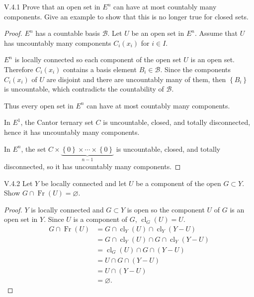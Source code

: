 \begin{problem}{V.4.1}
Prove that an open set in \( E^{n} \) can have at most countably many components. Give an example to show that this is no longer true for closed sets.
\end{problem}

\begin{proof}
	\( E^{n} \) has a countable basis \( \mathscr{B} \). Let \( U \) be an open set in \( E^{n} \). Assume that \( U \) has uncountably many components \( C_{i}(x_{i}) \) for \( i \in I \).

	\( E^{n} \) is locally connected so each component of the open set \( U \) is an open set. Therefore \( C_{i}(x_{i}) \) contains a basis element \( B_{i} \in \mathscr{B} \). Since the components \( C_{i}(x_{i}) \) of \( U \) are disjoint and there are uncountably many of them, then \( \left\{ B_{i} \right\} \) is uncountable, which contradicts the countability of \( \mathscr{B} \).

	Thus every open set in \( E^{n} \) can have at most countably many components.

	\bigskip

	In \( E^{1} \), the Cantor ternary set \( C \) is uncountable, closed, and totally disconnected, hence it has uncountably many components.

	In \( E^{n} \), the set \( C \times \underbrace{\left\{ 0 \right\} \times \cdots \times \left\{ 0 \right\}}_{n-1} \) is uncountable, closed, and totally disconnected, so it has uncountably many components.
\end{proof}

\begin{problem}{V.4.2}
Let \( Y \) be locally connected and let \( U \) be a component of the open \( G \subset Y \). Show \( G \cap \operatorname{Fr}(U) = \varnothing \).
\end{problem}

\begin{proof}
	\( Y \) is locally connected and \( G \subset Y \) is open so the component \( U \) of \( G \) is an open set in \( Y \). Since \( U \) is a component of \( G \), \( \operatorname{cl}_{G}(U) = U \).
	\begingroup
	\allowdisplaybreaks%
	\begin{align*}
		G \cap \operatorname{Fr}(U) & = G \cap \operatorname{cl}_{Y}(U) \cap \operatorname{cl}_{Y}(Y - U)        \\
		                            & = G \cap \operatorname{cl}_{Y}(U) \cap G \cap \operatorname{cl}_{Y}(Y - U) \\
		                            & = \operatorname{cl}_{G}(U) \cap G \cap (Y - U)                             \\
		                            & = U \cap G \cap (Y - U)                                                    \\
		                            & = U \cap (Y - U)                                                           \\
		                            & = \varnothing.
	\end{align*}
	\endgroup
\end{proof}


